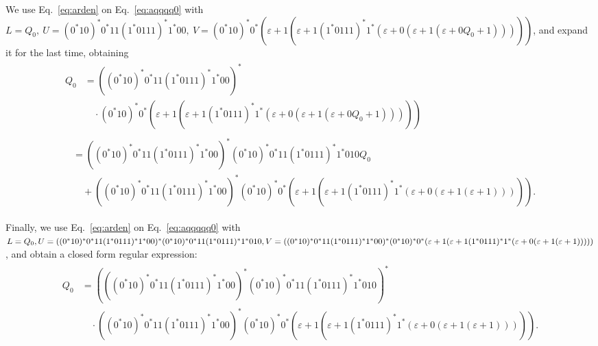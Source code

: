 \documentclass[12pt]{article}
\newcommand{\e}{\varepsilon}
\begin{document}
We use Eq.~\ref{eq:arden} on Eq.~\ref{eq:aqqqq0} with $L = Q_0,\
U = (0^*10)^*0^*11(1^*0111)^*1^*00,\
V = (0^*10)^*0^*(\e + 1(\e + 1(1^*0111)^*1^*(\e + 0(\e + 1(\e + 0Q_0 + 1)))))$,
and expand it for the last time, obtaining
\begin{align}
  \begin{split}
    Q_0 &= ((0^*10)^*0^*11(1^*0111)^*1^*00)^* \\
        & \quad \cdot (0^*10)^*0^*(\e + 1(\e + 1(1^*0111)^*1^*(\e
          + 0(\e + 1(\e + 0Q_0 + 1)))))
  \end{split} \\
  \begin{split} \label{eq:aqqqqq0}
    &= ((0^*10)^*0^*11(1^*0111)^*1^*00)^*(0^*10)^*0^*11(1^*0111)^*1^*010Q_0 \\
    & \quad + ((0^*10)^*0^*11(1^*0111)^*1^*00)^*(0^*10)^*0^*(\e + 1(\e
      + 1(1^*0111)^*1^*(\e + 0(\e + 1(\e + 1))))).
  \end{split}
\end{align}

Finally, we use Eq.~\ref{eq:arden} on Eq.~\ref{eq:aqqqqq0} with $L = Q_0,\ \\
U = ((0^*10)^*0^*11(1^*0111)^*1^*00)^*(0^*10)^*0^*11(1^*0111)^*1^*010,\ \\
V = ((0^*10)^*0^*11(1^*0111)^*1^*00)^*(0^*10)^*0^*(\e + 1(\e
+ 1(1^*0111)^*1^*(\e + 0(\e + 1(\e + 1)))))$, and obtain a closed form regular
expression:
\begin{align}
  \begin{split}
    Q_0 &= (((0^*10)^*0^*11(1^*0111)^*1^*00)^*(0^*10)^*0^*11(1^*0111)^*1^*010)^*
    \\  & \quad \cdot ((0^*10)^*0^*11(1^*0111)^*1^*00)^*(0^*10)^*0^*(\e + 1(\e
        + 1(1^*0111)^*1^*(\e + 0(\e + 1(\e + 1))))).
  \end{split}
\end{align}


{\footnotesize
}
\end{document}
